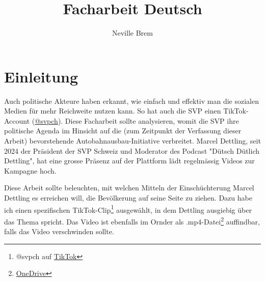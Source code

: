 \documentclass[12pt, a4paper]{article}
\title{Facharbeit Deutsch}
\author{Neville Brem}
\begin{document}
\maketitle

\newpage

\tableofcontents

\newpage

\section{Einleitung}
Auch politische Akteure haben erkannt, wie einfach und effektiv man die sozialen Medien für mehr Reichweite nutzen kann. So hat auch die SVP einen TikTok-Account (\href{https://www.tiktok.com/@svpch}{@svpch}). Diese Facharbeit sollte analysieren, womit die SVP ihre politische Agenda im Hinsicht auf die (zum Zeitpunkt der Verfassung dieser Arbeit) bevorstehende Autobahnausbau-Initiative verbreitet. Marcel Dettling, seit 2024 der Präsident der SVP Schweiz und Moderator des Podcast "Dütsch Dütlich Dettling", hat eine grosse Präsenz auf der Plattform lädt regelmässig Videos zur Kampagne hoch.

Diese Arbeit sollte beleuchten, mit welchen Mitteln der Einschüchterung Marcel Dettling es erreichen will, die Bevölkerung auf seine Seite zu ziehen. Dazu habe ich einen spezifischen TikTok-Clip\footnote{@svpch auf \href{https://www.tiktok.com/@svpch/video/7436069684971195680}{TikTok}} ausgewählt, in dem Dettling ausgiebig über das Thema spricht. Das Video ist ebenfalls im Ornder als .mp4-Datei\footnote{\href{https://eduzh-my.sharepoint.com/:v:/r/personal/neville_brem_mng_ch/Documents/HS24/Deutsch/Rhetorik/Facharbeit/Quellen/Video/tiktok_svpch_7432338486931246369.mp4?csf=1&web=1&e=eyQNpr}{OneDrive}} auffindbar, falls das Video verschwinden sollte.
\end{document}
